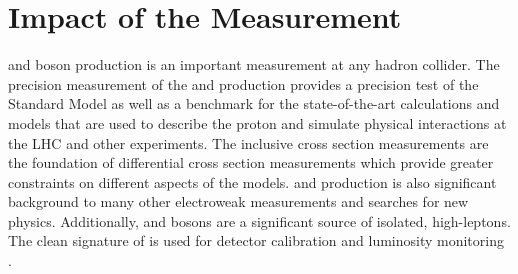 



\section{Impact of the Measurement}
\W and \Z boson production is an important measurement at any hadron collider. The precision measurement of the \W and \Z  production provides a precision test of the Standard Model as well as a benchmark for the state-of-the-art calculations and models that are used to describe the proton and simulate physical interactions at the LHC and other experiments. The inclusive cross section measurements are the foundation of differential cross section measurements which provide greater constraints on different aspects of the models.  \W and \Z production is also  significant background to many other electroweak measurements and searches for new physics.
Additionally, \W and \Z bosons are a significant source of isolated, high-\pt leptons. The clean signature of \zll is used for detector calibration and luminosity monitoring \cite{xinmei}.

